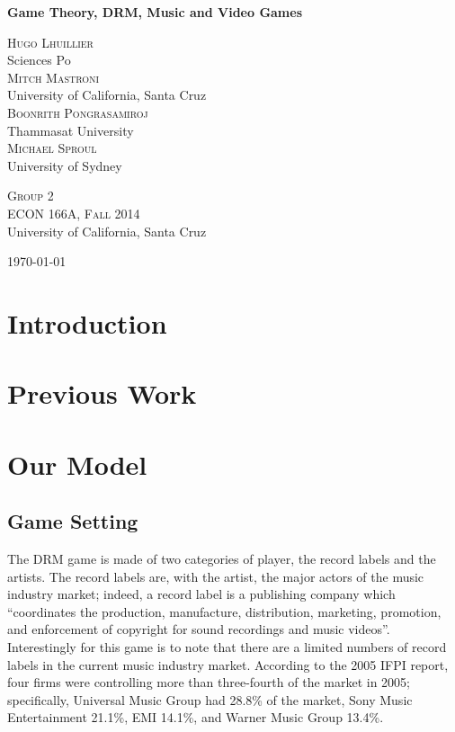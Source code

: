 \documentclass[a4paper,12pt]{article}
\numberwithin{equation}{section}
\begin{document}
\begin{titlepage}
\begin{center}

\vspace*{5cm}
\Large
\textbf{Game Theory, DRM, Music and Video Games}

\vspace*{0.5cm}
\large
\textsc{Hugo Lhuillier}\\
Sciences Po\\[1.2em]
\textsc{Mitch Mastroni}\\
University of California, Santa Cruz\\[1.2em]
\textsc{Boonrith Pongrasamiroj}\\
Thammasat University\\[1.2em]
\textsc{Michael Sproul}\\
University of Sydney

\vspace*{3cm}
\textsc{Group 2}\\[1.2em]
\textsc{ECON 166A, Fall 2014}\\
University of California, Santa Cruz

\vfill

\today

\end{center}
\end{titlepage}
\pagebreak

\section{Introduction}
\section{Previous Work}

\section{Our Model}
\subsection{Game Setting}

The DRM game is made of two categories of player, the record labels and the artists. The record labels are, with the artist, the major actors of the music industry market; indeed, a record label is a publishing company which ``coordinates the production, manufacture, distribution, marketing, promotion, and enforcement of copyright for sound recordings and music videos''\cite{klein2014}. Interestingly for this game is to note that there are a limited numbers of record labels in the current music industry market. According to the 2005 IFPI report, four firms were controlling more than three-fourth of the market in 2005; specifically, Universal Music Group had 28.8\% of the market, Sony Music Entertainment 21.1\%, EMI 14.1\%, and Warner Music Group 13.4\%.\\
\end{document}
